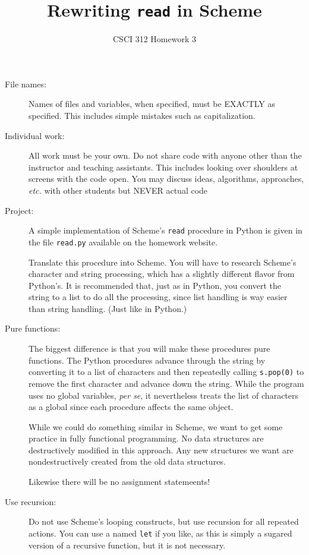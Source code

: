 \documentclass[12pt]{article}
\author{CSCI 312 Homework 3}
\title{Rewriting {\tt read} in Scheme}
\begin{document}
\maketitle
\begin{description}

\item[File names:]  Names of files and variables, when specified,
must be EXACTLY as specified.  This includes simple mistakes such
as capitalization.

\item[Individual work:]  All work must be your own.  Do not share
code with anyone other than the instructor and teaching assistants.
This includes looking over shoulders at screens with the code open.
You may discuss ideas, algorithms, approaches, {\em etc.} with
other students but NEVER actual code

\item[Project:] A simple implementation of Scheme's \lstinline{read}
procedure in Python is given in the file \lstinline{read.py}
available on the homework website.

Translate this procedure into Scheme.  You will have to 
research Scheme's character and string processing, which
has a slightly different flavor from Python's.  It is
recommended that, just as in Python, you convert the string
to a list to do all the processing, since list handling
is way easier than string handling.  (Just like in Python.)

\item[Pure functions:]
The biggest difference is that you will make these procedures
pure functions.  The Python procedures advance through the
string by converting it to a list of characters and then
repeatedly calling \lstinline{s.pop(0)} to remove the first
character and advance down the string.  While the program
uses no global variables, {\em per se}, it nevertheless treats
the list of characters as a global since each procedure
affects the same object. 

While we could do something similar in Scheme, we want
to get some practice in fully functional programming.
No data structures are destructively modified in this
approach.  Any new structures we want are nondestructively
created from the old data structures.

Likewise  there will be no assignment statemeents!

\item[Use recursion:]  Do not use Scheme's looping constructs,
but use recursion for all repeated actions.  You can use
a named \lstinline{let} if you like, as this is simply
a sugared version of a recursive function, but it is not
necessary.


\end{description}
\end{document}
